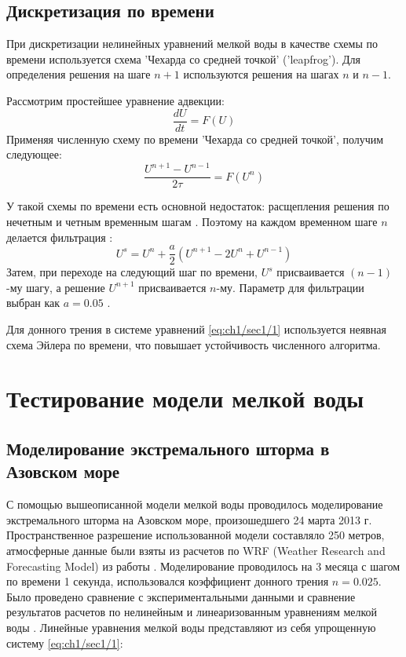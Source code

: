 \subsection{Дискретизация по времени}\label{sec:ch1/sec2-2}

При дискретизации нелинейных уравнений мелкой воды в качестве схемы по времени  используется схема 'Чехарда со средней точкой' ('leapfrog').
Для определения решения на шаге $n+1$ используются решения на шагах $n$ и $n-1$.

Рассмотрим простейшее уравнение адвекции:
\begin{equation} \label{eq:ch1/sec1/6}
    \frac{dU}{dt} = F(U)
\end{equation}
Применяя численную схему по времени 'Чехарда со средней точкой', получим следующее:
\begin{equation} \label{eq:ch1/sec1/7}
    \frac{U^{n+1} -U^{n-1} }{2\tau } = F(U^{n})
\end{equation}

У такой схемы по времени есть основной недостаток: расщепления решения по нечетным и четным временным шагам \cite{ROUCH}.
Поэтому на каждом временном шаге $n$ делается фильтрация \cite{POM}:
\begin{equation} \label{eq:ch1/sec1/8}
    U^{s} = U^{n} + \frac{a}{2}(U^{n+1} - 2U^n + U^{n-1})
\end{equation}
Затем, при переходе на следующий шаг по времени, $U^{s}$ присваивается $(n-1)$-му шагу, а решение $U^{n+1}$ присваивается $n$-му.
Параметр для фильтрации выбран как $a = 0.05$ \cite{POM}.

Для донного трения в системе уравнений \cref{eq:ch1/sec1/1} используется неявная схема Эйлера по времени,
что повышает устойчивость численного алгоритма.

\section{Тестирование модели мелкой воды}


\subsection{Моделирование экстремального шторма в Азовском море}

С помощью вышеописанной модели мелкой воды проводилось моделирование экстремального шторма на Азовском море, произошедшего 24 марта 2013 г.
Пространственное разрешение использованной модели составляло 250 метров,
атмосферные данные были взяты из расчетов по WRF (Weather Research and Forecasting
Model) из работы \cite{AzovStorm}. 
Моделирование проводилось на 3 месяца с шагом по времени 1 секунда, использовался коэффициент донного трения $n = 0.025$.
Было проведено сравнение с экспериментальными данными и сравнение результатов расчетов по нелинейным и линеаризованным уравнениям мелкой воды \cite{MARESEDU}.
Линейные уравнения мелкой воды представляют из себя упрощенную систему \ref{eq:ch1/sec1/1}:

